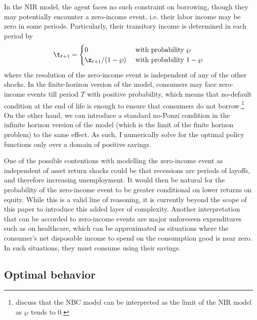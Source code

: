 In the NIR model, the agent faces no such constraint on borrowing, though they may potentially encounter a zero-income event, i.e. their labor income may be zero in some periods. Particularly, their transitory income is determined in each period by
\[
\t_{t+1} = \begin{cases}
    0 & \text{ with probability } \wp\\
    \z_{t+1} / (1 - \wp) & \text{ with probability } 1 - \wp
\end{cases}
\]
where the resolution of the zero-income event is independent of any of the other shocks. In the finite-horizon version of the model, consumers may face zero-income events till period $T$ with positive probability, which means that no-default condition at the end of life is enough to ensure that consumers do not borrow.\footnote{\citet{Carroll2024b} discuss that the NBC model can be interpreted as the limit of the NIR model as $\wp$ tends to 0.} On the other hand, we can introduce a standard no-Ponzi condition in the infinite horizon version of the model (which is the limit of the finite horizon problem) to the same effect. As such, I numerically solve for the optimal policy functions only over a domain of positive savings.

One of the possible contentions with modelling the zero-income event as independent of asset return shocks could be that recessions are periods of layoffs, and therefore increasing unemployment. It would then be natural for the probability of the zero-income event to be greater conditional on lower returns on equity. While this is a valid line of reasoning, it is currently beyond the scope of this paper to introduce this added layer of complexity. Another interpretation that can be accorded to zero-income events are major unforeseen expenditures such as on healthcare, which can be approximated as situations where the consumer's net disposable income to spend on the consumption good is near zero. In such situations, they must consume using their savings.

\subsection{Optimal behavior}

